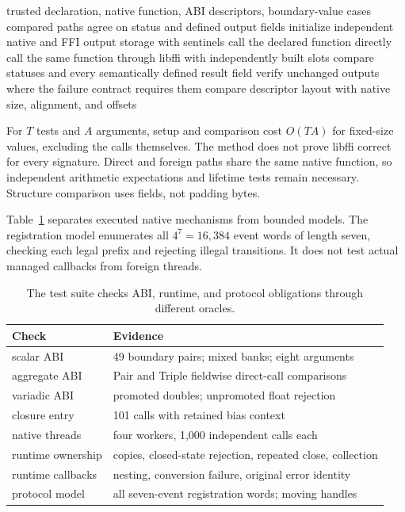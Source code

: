\begin{algorithm}[htbp]
\caption{Check a foreign-call path against a compiler-generated native oracle.}
\label{alg:ch76-differential}
\begin{pseudocode}
\Require trusted declaration, native function, ABI descriptors, boundary-value cases
\Ensure compared paths agree on status and defined output fields
  \State initialize independent native and FFI output storage with sentinels
  \State call the declared function directly
  \State call the same function through libffi with independently built slots
  \State compare statuses and every semantically defined result field
  \State verify unchanged outputs where the failure contract requires them
\EndFor
\State compare descriptor layout with native size, alignment, and offsets
\end{pseudocode}
\end{algorithm}

For $T$ tests and $A$ arguments, setup and comparison cost $O(TA)$ for fixed-size values, excluding the calls themselves.
The method does not prove libffi correct for every signature.
Direct and foreign paths share the same native function, so independent arithmetic expectations and lifetime tests remain necessary.
Structure comparison uses fields, not padding bytes.

Table~\ref{tab:ch76-tests} separates executed native mechanisms from bounded models.
The registration model enumerates all $4^7=16{,}384$ event words of length seven, checking each legal prefix and rejecting illegal transitions.
It does not test actual managed callbacks from foreign threads.

\begin{table}[htbp]
\caption{The test suite checks ABI, runtime, and protocol obligations through different oracles.}
\label{tab:ch76-tests}
\centering
\begin{tabular}{ll}
\toprule
Check & Evidence \\
\midrule
scalar ABI & 49 boundary pairs; mixed banks; eight arguments \\
aggregate ABI & Pair and Triple fieldwise direct-call comparisons \\
variadic ABI & promoted doubles; unpromoted float rejection \\
closure entry & 101 calls with retained bias context \\
native threads & four workers, 1,000 independent calls each \\
runtime ownership & copies, closed-state rejection, repeated close, collection \\
runtime callbacks & nesting, conversion failure, original error identity \\
protocol model & all seven-event registration words; moving handles \\
\bottomrule
\end{tabular}
\end{table}

